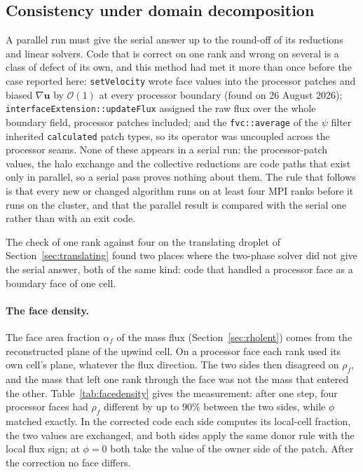 \documentclass[preprint,3p,11pt]{elsarticle}
\newcommand{\psilev}{\psi}                       %
\newcommand{\uvec}{\mathbf{u}}
\begin{document}
\subsection{Consistency under domain decomposition}
\label{sec:parallel}
A parallel run must give the serial answer up to the round-off of its reductions and
linear solvers. Code that is correct on one rank and wrong on several is a class of
defect of its own, and this method had met it more than once before the case reported
here: \texttt{setVelocity} wrote face values into the processor patches and biased
$\nabla\uvec$ by $\mathcal{O}(1)$ at every processor boundary (found on 26 August 2026);
\texttt{interfaceExtension::updateFlux} assigned the raw flux over the whole boundary
field, processor patches included; and the \texttt{fvc::average} of the $\psilev$ filter
inherited \texttt{calculated} patch types, so its operator was uncoupled across the
processor seams. None of these appears in a serial run: the processor-patch values, the
halo exchange and the collective reductions are code paths that exist only in parallel,
so a serial pass proves nothing about them. The rule that follows is that every new or
changed algorithm runs on at least four MPI ranks before it runs on the cluster, and that
the parallel result is compared with the serial one rather than with an exit code.

The check of one rank against four on the translating droplet of
Section~\ref{sec:translating} found two places where the two-phase solver did not give
the serial answer, both of the same kind: code that handled a processor face as a
boundary face of one cell.

\paragraph{The face density.} The face area fraction $\alpha_f$ of the mass flux
(Section~\ref{sec:rholent}) comes from the reconstructed plane of the upwind cell. On a
processor face each rank used its own cell's plane, whatever the flux direction. The two
sides then disagreed on $\rho_f$, and the mass that left one rank through the face was
not the mass that entered the other. Table~\ref{tab:facedensity} gives the measurement:
after one step, four processor faces had $\rho_f$ different by up to $90\%$ between the
two sides, while $\phi$ matched exactly. In the corrected code each side computes its
local-cell fraction, the two values are exchanged, and both sides apply the same donor
rule with the local flux sign; at $\phi=0$ both take the value of the owner side of the
patch. After the correction no face differs.
\end{document}
